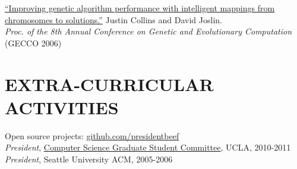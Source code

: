 \documentclass[margin]{res}
\begin{document}
\begin{resume}
\href{http://cs.ucla.edu/~collins/documents/Collins_Joslin-GECCO06-abstract.pdf}{``Improving genetic algorithm performance with intelligent mappings from chromosomes to solutions.''} Justin Collins and David Joslin. \\
{\it Proc. of the 8th Annual Conference on Genetic and Evolutionary Computation} (GECCO 2006)

\section{EXTRA-CURRICULAR \\ ACTIVITIES}             
Open source projects: \href{http://github.com/presidentbeef}{github.com/presidentbeef}\\
{\sl President}, \href{http://csgsc.cs.ucla.edu/}{Computer Science Graduate Student Committee}, UCLA, 2010-2011 \\
{\sl President}, Seattle University ACM, 2005-2006

\end{resume}
\end{document}
